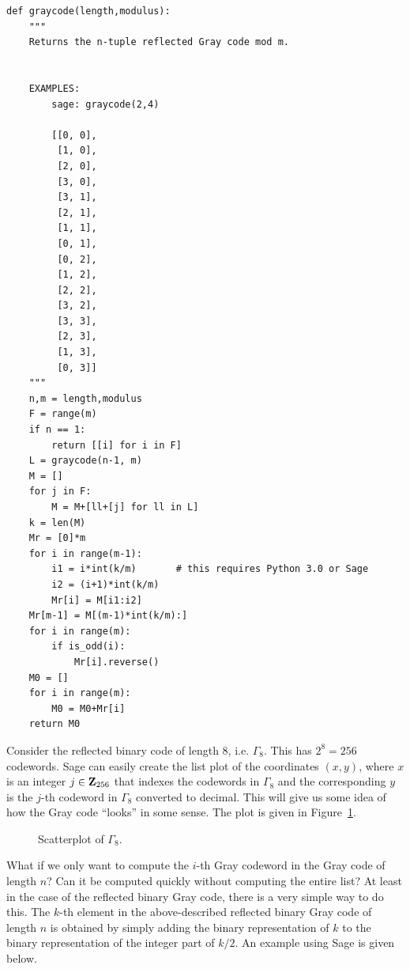\begin{lstlisting}
def graycode(length,modulus):
    """
    Returns the n-tuple reflected Gray code mod m.


    EXAMPLES:
        sage: graycode(2,4)

        [[0, 0],
         [1, 0],
         [2, 0],
         [3, 0],
         [3, 1],
         [2, 1],
         [1, 1],
         [0, 1],
         [0, 2],
         [1, 2],
         [2, 2],
         [3, 2],
         [3, 3],
         [2, 3],
         [1, 3],
         [0, 3]]
    """
    n,m = length,modulus
    F = range(m)
    if n == 1:
        return [[i] for i in F]
    L = graycode(n-1, m)
    M = []
    for j in F:
        M = M+[ll+[j] for ll in L]
    k = len(M)
    Mr = [0]*m
    for i in range(m-1):
        i1 = i*int(k/m)       # this requires Python 3.0 or Sage
        i2 = (i+1)*int(k/m)
        Mr[i] = M[i1:i2]
    Mr[m-1] = M[(m-1)*int(k/m):]
    for i in range(m):
        if is_odd(i):
            Mr[i].reverse()
    M0 = []
    for i in range(m):
        M0 = M0+Mr[i]
    return M0
\end{lstlisting}

\vskip 0.2in
Consider the reflected binary code of
length $8$, i.e. $\Gamma_8$. This has $2^8 = 256$ codewords. Sage can
easily create the list plot of the coordinates $(x,y)$, where $x$ is
an integer $j \in \mathbf{Z}_{256}$ that indexes the codewords in $\Gamma_8$
and the corresponding $y$ is the $j$-th codeword in $\Gamma_8$
converted to decimal. This will give us some idea of how the Gray code
``looks'' in some sense. The plot is given in
Figure~\ref{fig:trees_forests:Gamma_8}.

\begin{figure}[!htbp]
\centering
{}

\caption{Scatterplot of $\Gamma_8$.}
\label{fig:trees_forests:Gamma_8}
\end{figure}

What if we only want to compute the $i$-th Gray codeword in the Gray
code of length $n$? Can it be computed quickly without computing the
entire list? At least in the case of the reflected binary Gray code,
there is a very simple way to do this. The $k$-th element in the
above-described reflected binary Gray code of length $n$ is obtained
by simply adding the binary representation of $k$ to the binary
representation of the integer part of $k / 2$. An example using Sage
is given below.

